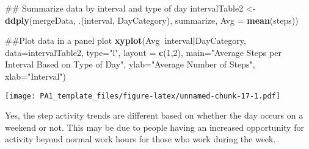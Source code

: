 \documentclass[]{article}
\newenvironment{Shaded}{\begin{snugshade}}{\end{snugshade}}
\newcommand{\KeywordTok}[1]{\textcolor[rgb]{0.13,0.29,0.53}{\textbf{#1}}}
\newcommand{\DataTypeTok}[1]{\textcolor[rgb]{0.13,0.29,0.53}{#1}}
\newcommand{\DecValTok}[1]{\textcolor[rgb]{0.00,0.00,0.81}{#1}}
\newcommand{\StringTok}[1]{\textcolor[rgb]{0.31,0.60,0.02}{#1}}
\newcommand{\OperatorTok}[1]{\textcolor[rgb]{0.81,0.36,0.00}{\textbf{#1}}}
\newcommand{\NormalTok}[1]{#1}
\begin{document}
\begin{Shaded}
\begin{Highlighting}[]
\NormalTok{## Summarize data by interval and type of day}
\NormalTok{intervalTable2 <-}\StringTok{ }\KeywordTok{ddply}\NormalTok{(mergeData, .(interval, DayCategory), summarize, }\DataTypeTok{Avg =} \KeywordTok{mean}\NormalTok{(steps))}

\NormalTok{##Plot data in a panel plot}
\KeywordTok{xyplot}\NormalTok{(Avg}\OperatorTok{~}\NormalTok{interval}\OperatorTok{|}\NormalTok{DayCategory, }\DataTypeTok{data=}\NormalTok{intervalTable2, }\DataTypeTok{type=}\StringTok{"l"}\NormalTok{,  }\DataTypeTok{layout =} \KeywordTok{c}\NormalTok{(}\DecValTok{1}\NormalTok{,}\DecValTok{2}\NormalTok{),}
       \DataTypeTok{main=}\StringTok{"Average Steps per Interval Based on Type of Day"}\NormalTok{, }
       \DataTypeTok{ylab=}\StringTok{"Average Number of Steps"}\NormalTok{, }\DataTypeTok{xlab=}\StringTok{"Interval"}\NormalTok{)}
\end{Highlighting}
\end{Shaded}

\texttt{[image: PA1\_template\_files/figure-latex/unnamed-chunk-17-1.pdf]}

Yes, the step activity trends are different based on whether the day
occurs on a weekend or not. This may be due to people having an
increased opportunity for activity beyond normal work hours for those
who work during the week.
\end{document}
